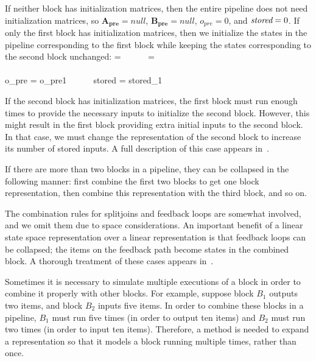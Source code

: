 If neither block has initialization matrices, then the entire pipeline
does not need initialization matrices, so $\mathbf{A_{pre}} = null$,
$\mathbf{B_{pre}} = null$, $o_{pre} = 0$, and $\mbox{\it stored} = 0$. If
only the first block has initialization matrices, then we initialize
the states in the pipeline corresponding to the first block while
keeping the states corresponding to the second block unchanged:
\starteqnstar
{} =  ~~~~~
 = 
\doneeqnstar ~ \\ \vspace{-36pt} ~ \\
\starteqnstar
o_{pre} = o_{pre1} ~~~~~
stored = stored_1
\doneeqnstar

If the second block has initialization matrices, the first block must
run enough times to provide the necessary inputs to initialize the
second block. However, this might result in the first block providing
extra initial inputs to the second block. In that case, we must change
the representation of the second block to increase its number of
stored inputs.  A full description of this case appears
in~\cite[pp.46-49]{Agrawal04}.

If there are more than two blocks in a pipeline, they can be collapsed
in the following manner: first combine the first two blocks to get one
block representation, then combine this representation with the third
block, and so on.


The combination rules for splitjoins and feedback loops are somewhat
involved, and we omit them due to space considerations.  An important
benefit of a linear state space representation over a linear
representation is that feedback loops can be collapsed; the items on
the feedback path become states in the combined block.  A thorough
treatment of these cases appears in~\cite[pp.36-43]{Agrawal04}.

\label{sec:expansion}

Sometimes it is necessary to simulate multiple executions of a block
in order to combine it properly with other blocks.  For example,
suppose block $B_1$ outputs two items, and block $B_2$ inputs five
items. In order to combine these blocks in a pipeline, $B_1$ must run
five times (in order to output ten items) and $B_2$ must run two times
(in order to input ten items). Therefore, a method is needed to expand
a representation so that it models a block running multiple times,
rather than once.

